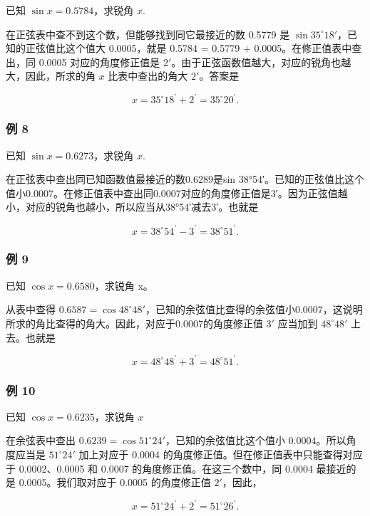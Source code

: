 已知 \(\sin x = 0.5784\)，求锐角 \(x\).

 在正弦表中查不到这个数，但能够找到同它最接近的数 0.5779
是 \(\sin 35^{\circ}18'\)，已知的正弦值比这个值大 0.0005，就是 0.5784 =
0.5779 + 0.0005。在修正值表中查出，同 0.0005 对应的角度修正值是
\(2'\)。由于正弦函数值越大，对应的锐角也越大，因此，所求的角 \(x\)
比表中查出的角大 \(2'\)。答案是

\[
x = 35 ^{\circ} 18 ^{\prime} + 2 ^{\prime} = 35 ^{\circ} 20 ^{\prime}.
\]

\subsubsection{例 8}

已知 \(\sin x = 0.6273\)，求锐角 \(x\).

 在正弦表中查出同已知函数值最接近的数0.6289是sin
38°54′。已知的正弦值比这个值小0.0007。在修正值表中查出同0.0007对应的角度修正值是3′。因为正弦值越小，对应的锐角也越小，所以应当从38°54′减去3′。也就是

\[
x = 38 ^{\circ} 54 ^{\prime} - 3 ^{\prime} = 38 ^{\circ} 51 ^{\prime}.
\]

\subsubsection{例 9}

已知 \(\cos x = 0.6580\)，求锐角 x。

 从表中查得
\(0.6587 = \cos 48^{\circ}48'\)，已知的余弦值比查得的余弦值小0.0007，这说明所求的角比查得的角大。因此，对应于0.0007的角度修正值
\(3'\) 应当加到 \(48^{\circ}48'\) 上去。也就是

\[
x = 48 ^{\circ} 48 ^{\prime} + 3 ^{\prime} = 48 ^{\circ} 51 ^{\prime}.
\]

\subsubsection{例 10}

已知 \(\cos x = 0.6235\)，求锐角 \(x\)

 在余弦表中查出
\(0.6239 = \cos 51^{\circ}24'\)，已知的余弦值比这个值小
0.0004。所以角度应当是 \(51^{\circ}24'\) 加上对应于 0.0004
的角度修正值。但在修正值表中只能查得对应于 0.0002、0.0005 和 0.0007
的角度修正值。在这三个数中，同 0.0004 最接近的是 0.0005。我们取对应于
0.0005 的角度修正值 \(2'\)，因此，

\[
x = 51 ^{\circ} 24 ^{\prime} + 2 ^{\prime} = 51 ^{\circ} 26 ^{\prime}.
\]


